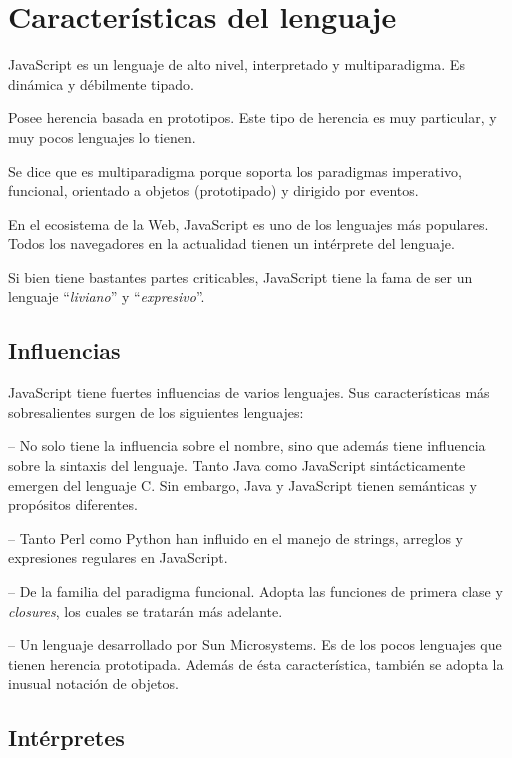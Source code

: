 \section{Características del lenguaje}

JavaScript es un lenguaje de alto nivel, interpretado y multiparadigma. Es dinámica y débilmente tipado. 

Posee herencia basada en prototipos. Este tipo de herencia es muy particular, y muy pocos lenguajes lo tienen. 

Se dice que es multiparadigma porque soporta los paradigmas imperativo, funcional, orientado a objetos (prototipado) y dirigido por eventos.

En el ecosistema de la Web, JavaScript es uno de los lenguajes más populares. Todos los navegadores en la actualidad tienen un intérprete del lenguaje.

Si bien tiene bastantes partes criticables, JavaScript tiene la fama de ser un lenguaje "`\textit{liviano}"' y "`\textit{expresivo}"'.

\subsection{Influencias}

JavaScript tiene fuertes influencias de varios lenguajes. Sus características más sobresalientes surgen de los siguientes lenguajes: 

 -- No solo tiene la influencia sobre el nombre, sino que además tiene influencia sobre la sintaxis del lenguaje. Tanto Java como JavaScript sintácticamente emergen del lenguaje C. Sin embargo, Java y JavaScript tienen semánticas y propósitos diferentes.

 -- Tanto Perl como Python han influido en el manejo de strings, arreglos y expresiones regulares en JavaScript.

 -- De la familia del paradigma funcional. Adopta las funciones de primera clase y \textit{closures}, los cuales se tratarán más adelante.

 -- Un lenguaje desarrollado por Sun Microsystems. Es de los pocos lenguajes que tienen herencia prototipada. Además de ésta característica, también se adopta la inusual notación de objetos.

\subsection{Intérpretes}


